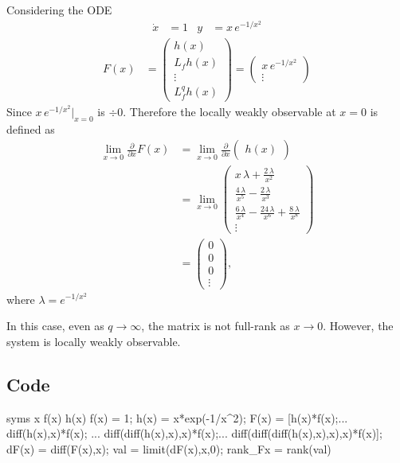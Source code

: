 Considering the ODE
\begin{align*}
    \dot x &= 1 & y &= x\,e^{-1/x^2}
\end{align*}
\begin{align*}
    F(x) &= \begin{pmatrix}
        h(x) \\ L_fh(x) \\ \vdots \\ L_f^qh(x)
    \end{pmatrix} = \begin{pmatrix}
        x\,e^{-1/x^2} \\ \vdots 
    \end{pmatrix}
\end{align*}
Since $x\,e^{-1/x^2}|_{x = 0}$ is $\div 0$. Therefore the locally weakly observable at $x = 0$ is defined as 
\begin{align*}
    \lim_{x \to 0} \frac{\partial}{\partial x}F(x) &= \lim_{x \to 0} \frac{\partial}{\partial x}\begin{pmatrix}
        h(x) 
    \end{pmatrix} \\ 
    &= \lim_{x \to 0} \begin{pmatrix}
        x\,\lambda + \frac{2\,\lambda}{x^2} \\
        \frac{4\,\lambda}{x^5} - \frac{2\,\lambda}{x^3} \\
        \frac{6\,\lambda}{x^4} - \frac{24\,\lambda}{x^6} + \frac{8\,\lambda}{x^8} \\
        \vdots 
    \end{pmatrix} \\
    &= \begin{pmatrix}
        0 \\ 0 \\ 0 \\ \vdots 
    \end{pmatrix},
\end{align*}
where $\lambda = e^{-1/x^2}$

In this case, even as $q \to \infty$, the matrix is not full-rank as $x \to 0$. However, the system is locally weakly observable.


\subsection*{Code}
\begin{matlabcode}
syms x f(x) h(x)
f(x) = 1; h(x) = x*exp(-1/x^2);
F(x) = [h(x)*f(x);...
    diff(h(x),x)*f(x); ...
    diff(diff(h(x),x),x)*f(x);...
    diff(diff(diff(h(x),x),x),x)*f(x)];
dF(x) = diff(F(x),x); val = limit(dF(x),x,0); rank_Fx = rank(val)
\end{matlabcode}